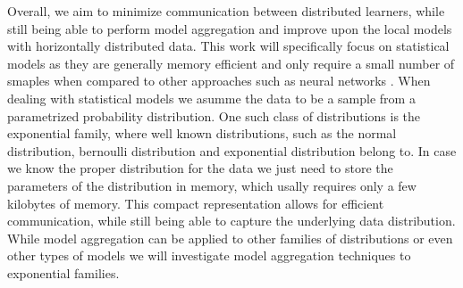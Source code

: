 
Overall, we aim to minimize communication between distributed learners, while still being able to perform model aggregation and improve upon the local models with horizontally distributed data.
This work will specifically focus on statistical models as they are generally memory efficient and only require a small number of smaples when compared to other approaches such as neural networks . 
When dealing with statistical models we asumme the data to be a sample from a parametrized probability distribution.
One such class of distributions is the exponential family, where well known distributions, such as the normal distribution, bernoulli distribution and exponential distribution belong to.
In case we know the proper distribution for the data we just need to store the parameters of the distribution in memory, which usally requires only a few kilobytes of memory.
This compact representation allows for efficient communication, while still being able to capture the underlying data distribution.
While model aggregation can be applied to other families of distributions or even other types of models we will investigate model aggregation techniques \wrt to exponential families.





